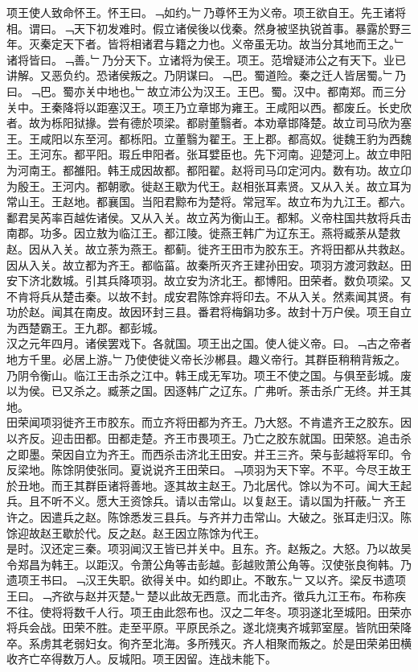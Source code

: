 \documentclass{zhvt-classic}
\begin{document}
\hspace*{2em}项王使人致命怀王。怀王曰。﹁如约。﹂乃尊怀王为义帝。项王欲自王。先王诸将相。谓曰。﹁天下初发难时。假立诸侯後以伐秦。然身被坚执锐首事。暴露於野三年。灭秦定天下者。皆将相诸君与籍之力也。义帝虽无功。故当分其地而王之。﹂诸将皆曰。﹁善。﹂乃分天下。立诸将为侯王。项王。范增疑沛公之有天下。业已讲解。又恶负约。恐诸侯叛之。乃阴谋曰。﹁巴。蜀道险。秦之迁人皆居蜀。﹂乃曰。﹁巴。蜀亦关中地也。﹂故立沛公为汉王。王巴。蜀。汉中。都南郑。而三分关中。王秦降将以距塞汉王。项王乃立章邯为雍王。王咸阳以西。都废丘。长史欣者。故为栎阳狱掾。尝有德於项梁。都尉董翳者。本劝章邯降楚。故立司马欣为塞王。王咸阳以东至河。都栎阳。立董翳为翟王。王上郡。都高奴。徙魏王豹为西魏王。王河东。都平阳。瑕丘申阳者。张耳嬖臣也。先下河南。迎楚河上。故立申阳为河南王。都雒阳。韩王成因故都。都阳翟。赵将司马卬定河内。数有功。故立卬为殷王。王河内。都朝歌。徙赵王歇为代王。赵相张耳素贤。又从入关。故立耳为常山王。王赵地。都襄国。当阳君黥布为楚将。常冠军。故立布为九江王。都六。鄱君吴芮率百越佐诸侯。又从入关。故立芮为衡山王。都邾。义帝柱国共敖将兵击南郡。功多。因立敖为临江王。都江陵。徙燕王韩广为辽东王。燕将臧荼从楚救赵。因从入关。故立荼为燕王。都蓟。徙齐王田市为胶东王。齐将田都从共救赵。因从入关。故立都为齐王。都临菑。故秦所灭齐王建孙田安。项羽方渡河救赵。田安下济北数城。引其兵降项羽。故立安为济北王。都博阳。田荣者。数负项梁。又不肯将兵从楚击秦。以故不封。成安君陈馀弃将印去。不从入关。然素闻其贤。有功於赵。闻其在南皮。故因环封三县。番君将梅鋗功多。故封十万户侯。项王自立为西楚霸王。王九郡。都彭城。\\
\hspace*{2em}汉之元年四月。诸侯罢戏下。各就国。项王出之国。使人徙义帝。曰。﹁古之帝者地方千里。必居上游。﹂乃使使徙义帝长沙郴县。趣义帝行。其群臣稍稍背叛之。乃阴令衡山。临江王击杀之江中。韩王成无军功。项王不使之国。与俱至彭城。废以为侯。已又杀之。臧荼之国。因逐韩广之辽东。广弗听。荼击杀广无终。并王其地。\\
\hspace*{2em}田荣闻项羽徙齐王市胶东。而立齐将田都为齐王。乃大怒。不肯遣齐王之胶东。因以齐反。迎击田都。田都走楚。齐王市畏项王。乃亡之胶东就国。田荣怒。追击杀之即墨。荣因自立为齐王。而西杀击济北王田安。并王三齐。荣与彭越将军印。令反梁地。陈馀阴使张同。夏说说齐王田荣曰。﹁项羽为天下宰。不平。今尽王故王於丑地。而王其群臣诸将善地。逐其故主赵王。乃北居代。馀以为不可。闻大王起兵。且不听不义。愿大王资馀兵。请以击常山。以复赵王。请以国为扞蔽。﹂齐王许之。因遣兵之赵。陈馀悉发三县兵。与齐并力击常山。大破之。张耳走归汉。陈馀迎故赵王歇於代。反之赵。赵王因立陈馀为代王。\\
\hspace*{2em}是时。汉还定三秦。项羽闻汉王皆已并关中。且东。齐。赵叛之。大怒。乃以故吴令郑昌为韩王。以距汉。令萧公角等击彭越。彭越败萧公角等。汉使张良徇韩。乃遗项王书曰。﹁汉王失职。欲得关中。如约即止。不敢东。﹂又以齐。梁反书遗项王曰。﹁齐欲与赵并灭楚。﹂楚以此故无西意。而北击齐。徵兵九江王布。布称疾不往。使将将数千人行。项王由此怨布也。汉之二年冬。项羽遂北至城阳。田荣亦将兵会战。田荣不胜。走至平原。平原民杀之。遂北烧夷齐城郭室屋。皆阬田荣降卒。系虏其老弱妇女。徇齐至北海。多所残灭。齐人相聚而叛之。於是田荣弟田横收齐亡卒得数万人。反城阳。项王因留。连战未能下。\\
\end{document}
